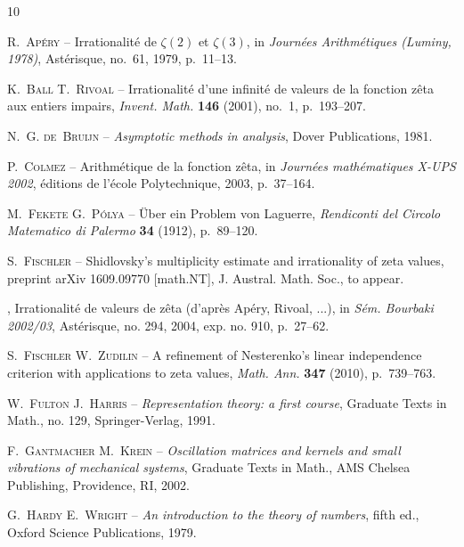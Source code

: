 \documentclass{article}
\numberwithin{equation}{section}
\theoremstyle{remark}
\begin{document}
\begin{thebibliography}{10}

{\scshape R.~Ap{\'e}ry} -- {\og Irrationalit\'e de $\zeta(2)$ et
  $\zeta(3)$\fg}, in \emph{Journ{\'e}es Arithm{\'e}tiques (Luminy, 1978)},
  Ast{\'e}risque, no.~61, 1979, p.~11--13.

{\scshape K.~Ball {\normalfont \smfandname} T.~Rivoal} -- {\og
  Irrationalit{\'e} d'une infinit{\'e} de valeurs de la fonction z\^eta aux
  entiers impairs\fg}, \emph{Invent. Math.} \textbf{146} (2001), no.~1,
  p.~193--207.

{\scshape N.~G. de~Bruijn} -- \emph{Asymptotic methods in analysis}, Dover
  Publications, 1981.

{\scshape P.~Colmez} -- {\og Arithm{\'e}tique de la fonction z\^eta\fg}, in
  \emph{Journ{\'e}es math{\'e}matiques X-UPS 2002}, {\'e}ditions de l'{\'e}cole
  {P}olytechnique, 2003, p.~37--164.

{\scshape M.~Fekete {\normalfont \smfandname} G.~P\'olya} -- {\og \"{U}ber ein
  {P}roblem von {L}aguerre\fg}, \emph{Rendiconti del Circolo Matematico di
  Palermo} \textbf{34} (1912), p.~89--120.

{\scshape S.~Fischler} -- {\og Shidlovsky's multiplicity estimate and
  irrationality of zeta values\fg}, preprint arXiv 1609.09770 [math.NT], J.
  Austral. Math. Soc., to appear.

\bysame , {\og Irrationalit{\'e} de valeurs de z\^eta (d'apr\`es {A}p{\'e}ry,
  {R}ivoal, ...)\fg}, in \emph{S{\'e}m. Bourbaki 2002/03}, Ast{\'e}risque, no.
  294, 2004, exp. no. 910, p.~27--62.

{\scshape S.~Fischler {\normalfont \smfandname} W.~Zudilin} -- {\og A
  refinement of {N}esterenko's linear independence criterion with applications
  to zeta values\fg}, \emph{Math. Ann.} \textbf{347} (2010), p.~739--763.

{\scshape W.~Fulton {\normalfont \smfandname} J.~Harris} --
  \emph{Representation theory: a first course}, Graduate Texts in Math., no.
  129, Springer-Verlag, 1991.

{\scshape F.~Gantmacher {\normalfont \smfandname} M.~Krein} --
  \emph{Oscillation matrices and kernels and small vibrations of mechanical
  systems}, Graduate Texts in Math., AMS Chelsea Publishing, Providence, RI,
  2002.

{\scshape G.~Hardy {\normalfont \smfandname} E.~Wright} -- \emph{An
  introduction to the theory of numbers}, fifth ed., Oxford Science
  Publications, 1979.


\end{thebibliography}
\end{document}
